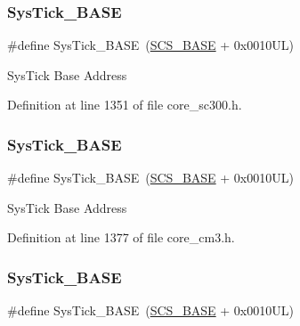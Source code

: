 \subsubsection{\texorpdfstring{Sys\+Tick\+\_\+\+B\+A\+SE}{SysTick\_BASE}\hspace{0.1cm}{\footnotesize\ttfamily [4/7]}}
{\footnotesize\ttfamily \#define Sys\+Tick\+\_\+\+B\+A\+SE~(\hyperlink{group___c_m_s_i_s__core__base_ga3c14ed93192c8d9143322bbf77ebf770}{S\+C\+S\+\_\+\+B\+A\+SE} +  0x0010\+U\+L)}

Sys\+Tick Base Address 

Definition at line 1351 of file core\+\_\+sc300.\+h.

\mbox{\label{group___c_m_s_i_s__core__base_ga58effaac0b93006b756d33209e814646}} 
\subsubsection{\texorpdfstring{Sys\+Tick\+\_\+\+B\+A\+SE}{SysTick\_BASE}\hspace{0.1cm}{\footnotesize\ttfamily [5/7]}}
{\footnotesize\ttfamily \#define Sys\+Tick\+\_\+\+B\+A\+SE~(\hyperlink{group___c_m_s_i_s__core__base_ga3c14ed93192c8d9143322bbf77ebf770}{S\+C\+S\+\_\+\+B\+A\+SE} +  0x0010\+U\+L)}

Sys\+Tick Base Address 

Definition at line 1377 of file core\+\_\+cm3.\+h.

\mbox{\label{group___c_m_s_i_s__core__base_ga58effaac0b93006b756d33209e814646}} 
\subsubsection{\texorpdfstring{Sys\+Tick\+\_\+\+B\+A\+SE}{SysTick\_BASE}\hspace{0.1cm}{\footnotesize\ttfamily [6/7]}}
{\footnotesize\ttfamily \#define Sys\+Tick\+\_\+\+B\+A\+SE~(\hyperlink{group___c_m_s_i_s__core__base_ga3c14ed93192c8d9143322bbf77ebf770}{S\+C\+S\+\_\+\+B\+A\+SE} +  0x0010\+U\+L)}

